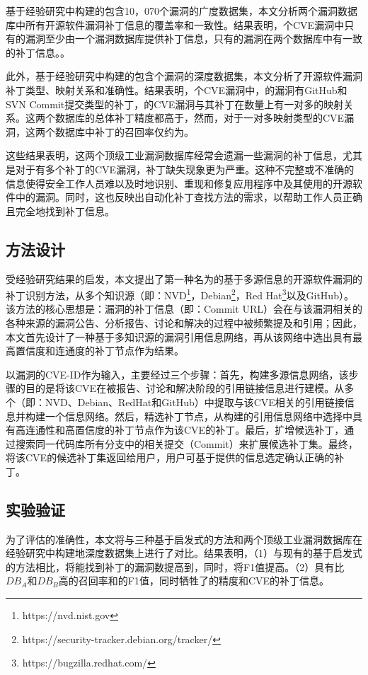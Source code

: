 基于经验研究中构建的包含10，070个漏洞的广度数据集，本文分析两个漏洞数据库中所有开源软件漏洞补丁信息的覆盖率和一致性。结果表明，个CVE漏洞中只有的漏洞至少由一个漏洞数据库提供补丁信息，只有的漏洞在两个数据库中有一致的补丁信息。。

此外，基于经验研究中构建的包含个漏洞的深度数据集，本文分析了开源软件漏洞补丁类型、映射关系和准确性。结果表明，个CVE漏洞中，的漏洞有GitHub和SVN Commit提交类型的补丁，的CVE漏洞与其补丁在数量上有一对多的映射关系。这两个数据库的总体补丁精度都高于，然而，对于一对多映射类型的CVE漏洞，这两个数据库中补丁的召回率仅约为。

这些结果表明，这两个顶级工业漏洞数据库经常会遗漏一些漏洞的补丁信息，尤其是对于有多个补丁的CVE漏洞，补丁缺失现象更为严重。这种不完整或不准确的信息使得安全工作人员难以及时地识别、重现和修复应用程序中及其使用的开源软件中的漏洞。同时，这也反映出自动化补丁查找方法的需求，以帮助工作人员正确且完全地找到补丁信息。

\subsection{方法设计}
受经验研究结果的启发，本文提出了第一种名为\tool 的基于多源信息的开源软件漏洞的补丁识别方法，从多个知识源（即：NVD\footnote{https://nvd.nist.gov}，Debian\footnote{https://security-tracker.debian.org/tracker/}，Red Hat\footnote{https://bugzilla.redhat.com/}以及GitHub）。该方法的核心思想是：漏洞的补丁信息（即：Commit URL）会在与该漏洞相关的各种来源的漏洞公告、分析报告、讨论和解决的过程中被频繁提及和引用；因此，本文首先设计了一种基于多知识源的漏洞引用信息网络，再从该网络中选出具有最高置信度和连通度的补丁节点作为结果。

\tool 以漏洞的CVE-ID作为输入，主要经过三个步骤：首先，构建多源信息网络，该步骤的目的是将该CVE在被报告、讨论和解决阶段的引用链接信息进行建模。\tool 从多个（即：NVD、Debian、RedHat和GitHub）中提取与该CVE相关的引用链接信息并构建一个信息网络。然后，精选补丁节点，\tool 从构建的引用信息网络中选择中具有高连通性和高置信度的补丁节点作为该CVE的补丁。最后，扩增候选补丁，\tool 通过搜索同一代码库所有分支中的相关提交（Commit）来扩展候选补丁集。最终，\tool 将该CVE的候选补丁集返回给用户，用户可基于\tool 提供的信息选定确认正确的补丁。

\subsection{实验验证}
为了评估\tool 的准确性，本文将\tool 与三种基于启发式的方法和两个顶级工业漏洞数据库在经验研究中构建地深度数据集上进行了对比。结果表明，（1）与现有的基于启发式的方法相比，\tool 将能找到补丁的漏洞数提高到，同时，将F1值提高。（2）\tool 具有比$DB_A$和$DB_B$高的召回率和的F1值，同时牺牲了的精度和CVE的补丁信息。

